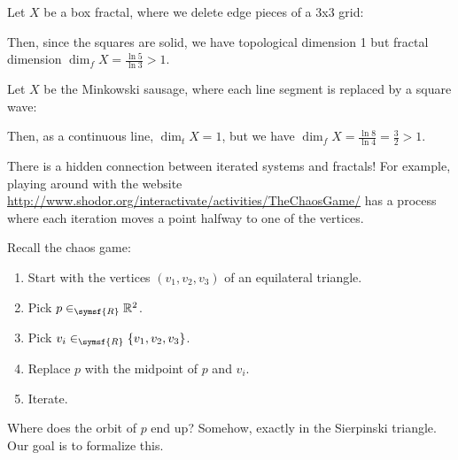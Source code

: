 \documentclass[class=pmath370,tikz,notes]{agony}
\begin{document}
\begin{example}\label{ex:box}
  Let $X$ be a box fractal, where we delete edge pieces of a 3x3 grid:
  \begin{center}
  \end{center}
  Then, since the squares are solid, we have topological dimension 1
  but fractal dimension $\dim_f X = \frac{\ln 5}{\ln 3} > 1$.
\end{example}

\begin{example}
  Let $X$ be the Minkowski sausage, where each line segment is replaced by a square wave:
  \begin{center}
  \end{center}
  Then, as a continuous line, $\dim_t X = 1$,
  but we have $\dim_f X = \frac{\ln 8}{\ln 4} = \frac32 > 1$.
\end{example}

There is a hidden connection between iterated systems and fractals!
For example, playing around with the website
\href{http://www.shodor.org/interactivate/activities/TheChaosGame/}{http://www.shodor.org/interactivate/activities/TheChaosGame/}
has a process where each iteration moves a point halfway to one of the vertices.


Recall the chaos game:
\begin{enumerate}[nosep]
  \item Start with the vertices $(v_1,v_2,v_3)$ of an equilateral triangle.
  \item Pick $p \in_{\symsf{R}} \R^2$.
  \item Pick $v_i \in_{\symsf{R}} \{v_1,v_2,v_3\}$.
  \item Replace $p$ with the midpoint of $p$ and $v_i$.
  \item Iterate.
\end{enumerate}
Where does the orbit of $p$ end up?
Somehow, exactly in the Sierpinski triangle.
Our goal is to formalize this.
\end{document}
